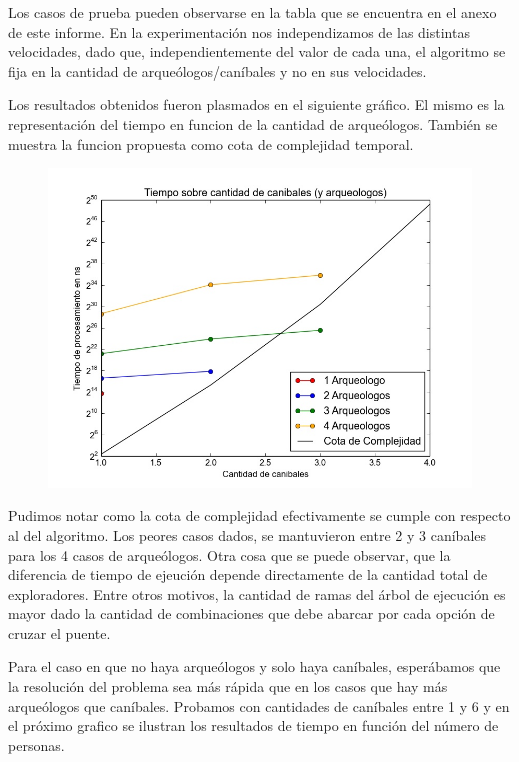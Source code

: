   Los casos de prueba pueden observarse en la tabla que se encuentra en el anexo de este informe. En la experimentación nos independizamos de las distintas velocidades, dado que, independientemente del valor de cada una, el algoritmo se fija en la cantidad de arqueólogos/caníbales y no en sus velocidades.

  Los resultados obtenidos fueron plasmados en el siguiente gráfico. El mismo es la representación del tiempo en funcion de la cantidad de arqueólogos. También se muestra la funcion propuesta como cota de complejidad temporal.

  \begin{figure}[H]
      \begin{center}
        \includegraphics[width=0.7\columnwidth]{imagenes/ej1exp1cotaCorregida.jpeg}
        \caption{}
      \end{center}
  \end{figure}


  Pudimos notar como la cota de complejidad efectivamente se cumple con respecto al del algoritmo. Los peores casos dados, se mantuvieron entre 2 y 3 caníbales para los 4 casos de arqueólogos. Otra cosa que se puede observar, que la diferencia de tiempo de ejeución depende directamente de la cantidad total de exploradores. Entre otros motivos, la cantidad de ramas del árbol de ejecución es mayor dado la cantidad de combinaciones que debe abarcar por cada opción de cruzar el puente.

  Para el caso en que no haya arqueólogos y solo haya caníbales, esperábamos que la resolución del problema sea más rápida que en los casos que hay más arqueólogos que caníbales. Probamos con cantidades de caníbales entre 1 y 6 y en el próximo grafico se ilustran los resultados de tiempo en función del número de personas.

